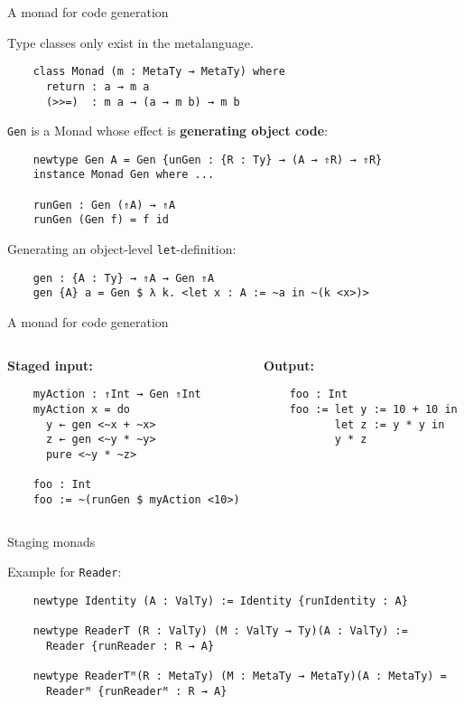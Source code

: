 \documentclass[dvipsnames,aspectratio=169]{beamer}
\newcommand{\ttt}[1]{{\texttt{#1}}}
\theoremstyle{remark}
\begin{document}
\begin{frame}[fragile]{A monad for code generation}

Type classes only exist in the metalanguage.
\begin{verbatim}
    class Monad (m : MetaTy → MetaTy) where
      return : a → m a
      (>>=)  : m a → (a → m b) → m b
\end{verbatim}
\ttt{Gen} is a Monad whose effect is \textbf{generating object code}:
\begin{verbatim}
    newtype Gen A = Gen {unGen : {R : Ty} → (A → ⇑R) → ⇑R}
    instance Monad Gen where ...

    runGen : Gen (⇑A) → ⇑A
    runGen (Gen f) = f id
\end{verbatim}

Generating an object-level \ttt{let}-definition:
\begin{verbatim}
    gen : {A : Ty} → ⇑A → Gen ⇑A
    gen {A} a = Gen $ λ k. <let x : A := ~a in ~(k <x>)>
\end{verbatim}

\end{frame}

\begin{frame}[fragile]{A monad for code generation}

\begin{columns}
\begin{column}{0.4\textwidth}
\textbf{Staged input:}
\begin{verbatim}
    myAction : ⇑Int → Gen ⇑Int
    myAction x = do
      y ← gen <~x + ~x>
      z ← gen <~y * ~y>
      pure <~y * ~z>

    foo : Int
    foo := ~(runGen $ myAction <10>)
\end{verbatim}
\end{column}
\begin{column}{0.5\textwidth}
\textbf{Output:}
\begin{verbatim}
    foo : Int
    foo := let y := 10 + 10 in
           let z := y * y in
           y * z




\end{verbatim}
\end{column}
\end{columns}

\end{frame}

\begin{frame}[fragile]{Staging monads}

Example for \ttt{Reader}:
\vspace{0.7em}

\begin{verbatim}
    newtype Identity (A : ValTy) := Identity {runIdentity : A}

    newtype ReaderT (R : ValTy) (M : ValTy → Ty)(A : ValTy) :=
      Reader {runReader : R → A}

    newtype ReaderTᴹ(R : MetaTy) (M : MetaTy → MetaTy)(A : MetaTy) =
      Readerᴹ {runReaderᴹ : R → A}
\end{verbatim}




\end{frame}
\end{document}
